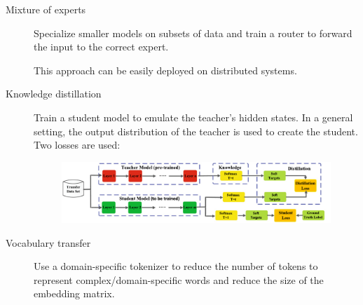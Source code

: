 \begin{description}
    \item[Mixture of experts] 
        Specialize smaller models on subsets of data and train a router to forward the input to the correct expert.

        \begin{remark}
            This approach can be easily deployed on distributed systems.
        \end{remark}

    \item[Knowledge distillation] 
        Train a student model to emulate the teacher's hidden states. In a general setting, the output distribution of the teacher is used to create the student. Two losses are used:

        \begin{figure}[H]
            \centering
            \includegraphics[width=0.8\linewidth]{./img/_distillation.pdf}
        \end{figure}

    \item[Vocabulary transfer] 
        Use a domain-specific tokenizer to reduce the number of tokens to represent complex/domain-specific words and reduce the size of the embedding matrix.


\end{description}
